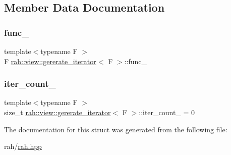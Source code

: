 \subsection{Member Data Documentation}
\mbox{\label{structrah_1_1view_1_1gererate__iterator_a990cec2a833b541afcaaf062443656e6}} 
\subsubsection{\texorpdfstring{func\_}{func\_}}
{\footnotesize\ttfamily template$<$typename F $>$ \\
F \mbox{\hyperlink{structrah_1_1view_1_1gererate__iterator}{rah\+::view\+::gererate\+\_\+iterator}}$<$ F $>$\+::func\+\_\+\hspace{0.3cm}{\ttfamily [mutable]}}

\mbox{\label{structrah_1_1view_1_1gererate__iterator_a59591e436791b5adf62e0cca9ad348a1}} 
\subsubsection{\texorpdfstring{iter\_count\_}{iter\_count\_}}
{\footnotesize\ttfamily template$<$typename F $>$ \\
size\+\_\+t \mbox{\hyperlink{structrah_1_1view_1_1gererate__iterator}{rah\+::view\+::gererate\+\_\+iterator}}$<$ F $>$\+::iter\+\_\+count\+\_\+ = 0}



The documentation for this struct was generated from the following file\+:\begin{DoxyCompactItemize}
\item 
rah/\mbox{\hyperlink{rah_8hpp}{rah.\+hpp}}\end{DoxyCompactItemize}
